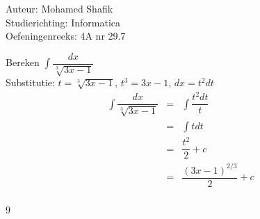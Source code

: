 \documentclass[a4paper]{article}
\begin{document}
\noindent \large Auteur: Mohamed Shafik \\
\noindent \large Studierichting: Informatica\\
\noindent \large Oefeningenreeks: 4A nr 29.7\\

\medskip

\normalsize

Bereken $\displaystyle\int \dfrac{dx}{\sqrt[3]{3x-1}}$\\

Substitutie: $t = \sqrt[3]{3x-1}$, $t^3 = 3x - 1$, $dx = t^2 dt$\\

\begin{eqnarray*}
\displaystyle\int \dfrac{dx}{\sqrt[3]{3x-1}} &=& \displaystyle\int \dfrac{t^2 dt}{t}\\
&=& \displaystyle\int t dt\\
&=& \dfrac{t^2}{2} + c\\
&=& \dfrac{(3x-1)^{2/3}}{2} + c\\
\end{eqnarray*}

\begin{thebibliography}{9}
\end{thebibliography}
\end{document}
